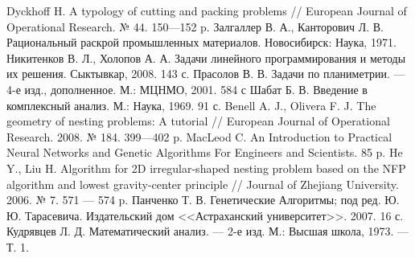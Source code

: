 \documentclass[14pt]{extarticle}
\begin{document}
	\begin{thebibliography}{1}
		 Dyckhoff H. A typology of cutting and packing problems // European Journal of Operational Research. № 44. 150---152 p.
		 Залгаллер В. А., Канторович Л. В. Рациональный раскрой промышленных материалов. Новосибирск: Наука, 1971.
		 Никитенков В. Л., Холопов А. А. Задачи линейного программирования и методы их решения. Сыктывкар, 2008. 143 с.
		  Прасолов В. В. Задачи по планиметрии. --- 4-е изд., дополненное. М.: МЦНМО, 2001. 584 с 
		 Шабат Б. В. Введение в комплексный анализ. М.: Наука, 1969. 91 с.
		 Benell A. J., Olivera F. J. The geometry of nesting problems: A tutorial // European Journal of Operational Research. 2008. № 184. 399---402 p.
		 MacLeod C. An Introduction to Practical Neural Networks and Genetic Algorithms For Engineers and Scientists. 85 p.
		 He Y., Liu H. Algorithm for 2D irregular-shaped nesting problem based on the NFP algorithm and lowest gravity-center principle // Journal of Zhejiang University. 2006. № 7. 571 --- 574 p.
		 Панченко Т. В. Генетические Алгоритмы; под ред. Ю. Ю. Тарасевича. Издательский дом <<Астраханский университет>>. 2007. 16 с.
		 Кудрявцев Л. Д. Математический анализ. — 2-е изд.  М.: Высшая школа, 1973. — Т. 1.
	\end{thebibliography}
\end{document}
